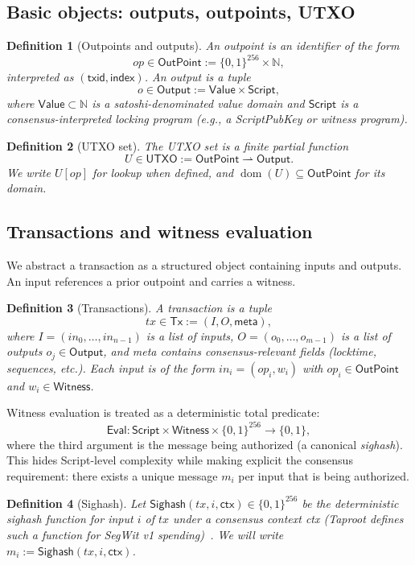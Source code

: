 \documentclass[11pt]{article}
\newtheorem{definition}{Definition}
\newcommand{\bits}{\{0,1\}}
\newcommand{\dom}{\operatorname{dom}}
\newcommand{\Tx}{\mathsf{Tx}}
\newcommand{\OutPoint}{\mathsf{OutPoint}}
\newcommand{\Output}{\mathsf{Output}}
\newcommand{\Value}{\mathsf{Value}}
\newcommand{\Script}{\mathsf{Script}}
\newcommand{\Witness}{\mathsf{Witness}}
\newcommand{\UTXO}{\mathsf{UTXO}}
\newcommand{\Eval}{\mathsf{Eval}}
\newcommand{\Sighash}{\mathsf{Sighash}}
\begin{document}
\subsection{Basic objects: outputs, outpoints, UTXO}

\begin{definition}[Outpoints and outputs]
An \emph{outpoint} is an identifier of the form
\[
op \in \OutPoint := \bits^{256} \times \mathbb{N},
\]
interpreted as $(\textsf{txid},\textsf{index})$.
An \emph{output} is a tuple
\[
o \in \Output := \Value \times \Script,
\]
where $\Value \subset \mathbb{N}$ is a satoshi-denominated value domain and $\Script$ is a consensus-interpreted locking program (e.g., a ScriptPubKey or witness program).
\end{definition}

\begin{definition}[UTXO set]
The UTXO set is a finite partial function
\[
U \in \UTXO := \OutPoint \rightharpoonup \Output.
\]
We write $U[op]$ for lookup when defined, and $\dom(U)\subseteq \OutPoint$ for its domain.
\end{definition}

\subsection{Transactions and witness evaluation}

We abstract a transaction as a structured object containing inputs and outputs.
An input references a prior outpoint and carries a witness.

\begin{definition}[Transactions]
A transaction is a tuple
\[
tx \in \Tx := (I,O,\textsf{meta}),
\]
where $I=(in_0,\dots,in_{n-1})$ is a list of inputs, $O=(o_0,\dots,o_{m-1})$ is a list of outputs $o_j\in\Output$, and \textsf{meta} contains consensus-relevant fields (locktime, sequences, etc.).
Each input is of the form $in_i=(op_i,w_i)$ with $op_i\in\OutPoint$ and $w_i\in\Witness$.
\end{definition}

Witness evaluation is treated as a deterministic total predicate:
\[
\Eval:\Script \times \Witness \times \bits^{256} \to \bits,
\]
where the third argument is the message being authorized (a canonical \emph{sighash}).
This hides Script-level complexity while making explicit the consensus requirement: there exists a unique message $m_i$ per input that is being authorized.

\begin{definition}[Sighash]
Let $\Sighash(tx,i,\textsf{ctx}) \in \bits^{256}$ be the deterministic sighash function for input $i$ of $tx$ under a consensus context \textsf{ctx} (Taproot defines such a function for SegWit v1 spending)~\cite{bip341,bip342}.
We will write $m_i := \Sighash(tx,i,\textsf{ctx})$.
\end{definition}
\end{document}
